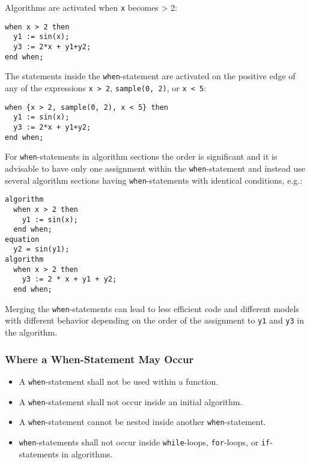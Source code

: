 \begin{example}
Algorithms are activated when \lstinline!x! becomes \textgreater{} 2:
\begin{lstlisting}[language=modelica]
when x > 2 then
  y1 := sin(x);
  y3 := 2*x + y1+y2;
end when;
\end{lstlisting}
The statements inside the \lstinline!when!-statement are activated on the positive edge of any of the expressions \lstinline!x > 2!, \lstinline!sample(0, 2)!, or \lstinline!x < 5!:
\begin{lstlisting}[language=modelica]
when {x > 2, sample(0, 2), x < 5} then
  y1 := sin(x);
  y3 := 2*x + y1+y2;
end when;
\end{lstlisting}
For \lstinline!when!-statements in algorithm sections the order is significant and it is advisable to have only one assignment within the \lstinline!when!-statement and instead use several algorithm sections having \lstinline!when!-statements with identical conditions, e.g.:
\begin{lstlisting}[language=modelica]
algorithm
  when x > 2 then
    y1 := sin(x);
  end when;
equation
  y2 = sin(y1);
algorithm
  when x > 2 then
    y3 := 2 * x + y1 + y2;
  end when;
\end{lstlisting}
Merging the \lstinline!when!-statements can lead to less efficient code and different models with different behavior depending on the order of the assignment to \lstinline!y1! and \lstinline!y3! in the algorithm.
\end{example}

\subsubsection{Where a When-Statement May Occur}\label{restrictions-on-where-a-when-statement-may-occur}\label{where-a-when-statement-may-occur}

\begin{itemize}
\item
  A \lstinline!when!-statement shall not be used within a function.
\item
  A \lstinline!when!-statement shall not occur inside an initial algorithm.
\item
  A \lstinline!when!-statement cannot be nested inside another \lstinline!when!-statement.
\item
  \lstinline!when!-statements shall not occur inside \lstinline!while!-loops, \lstinline!for!-loops, or \lstinline!if!-statements in algorithms.
\end{itemize}

